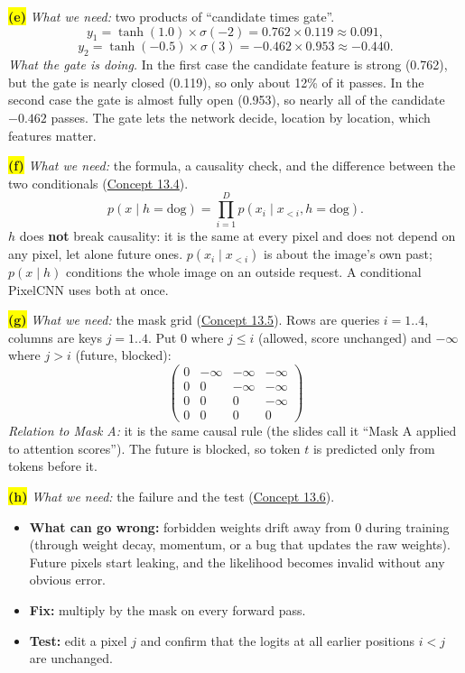 \documentclass[12pt,a4paper]{article}
\begin{document}
\colorbox{yellow}{\textbf{(e)}} \emph{What we need:} two products of ``candidate times gate''.
\[
y_1=\tanh(1.0)\times\sigma(-2)=0.762\times0.119\approx0.091,
\]
\[
y_2=\tanh(-0.5)\times\sigma(3)=-0.462\times0.953\approx-0.440 .
\]
\emph{What the gate is doing.} In the first case the candidate feature is strong (0.762), but the gate is nearly closed (0.119), so only about 12\% of it passes. In the second case the gate is almost fully open (0.953), so nearly all of the candidate $-0.462$ passes. The gate lets the network decide, location by location, which features matter.

\colorbox{yellow}{\textbf{(f)}} \emph{What we need:} the formula, a causality check, and the difference between the two conditionals (\hyperref[c13-4]{Concept 13.4}).
\[
p(x\mid h=\text{dog})=\prod_{i=1}^{D}p(x_i\mid x_{<i},h=\text{dog}).
\]
$h$ does \textbf{not} break causality: it is the same at every pixel and does not depend on any pixel, let alone future ones. $p(x_i\mid x_{<i})$ is about the image's own past; $p(x\mid h)$ conditions the whole image on an outside request. A conditional PixelCNN uses both at once.

\colorbox{yellow}{\textbf{(g)}} \emph{What we need:} the mask grid (\hyperref[c13-5]{Concept 13.5}). Rows are queries $i=1..4$, columns are keys $j=1..4$. Put 0 where $j\le i$ (allowed, score unchanged) and $-\infty$ where $j>i$ (future, blocked):
\[
\begin{pmatrix}0&-\infty&-\infty&-\infty\\0&0&-\infty&-\infty\\0&0&0&-\infty\\0&0&0&0\end{pmatrix}
\]
\emph{Relation to Mask A:} it is the same causal rule (the slides call it ``Mask A applied to attention scores''). The future is blocked, so token $t$ is predicted only from tokens before it.

\colorbox{yellow}{\textbf{(h)}} \emph{What we need:} the failure and the test (\hyperref[c13-6]{Concept 13.6}).
\begin{itemize}[nosep]
  \item \textbf{What can go wrong:} forbidden weights drift away from 0 during training (through weight decay, momentum, or a bug that updates the raw weights). Future pixels start leaking, and the likelihood becomes invalid without any obvious error.
  \item \textbf{Fix:} multiply by the mask on every forward pass.
  \item \textbf{Test:} edit a pixel $j$ and confirm that the logits at all earlier positions $i<j$ are unchanged.
\end{itemize}
\newpage
\end{document}

